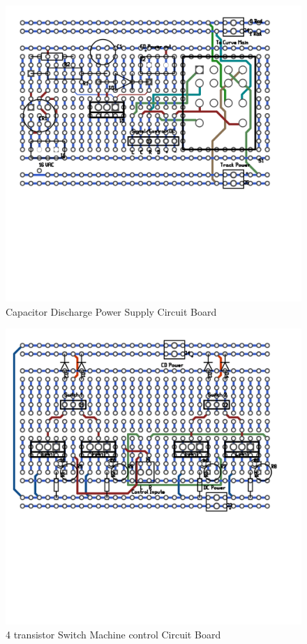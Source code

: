 \begin{figure}[hbpt]
\begin{centering}
\includegraphics[width=5in]{CD-on-SB400.pdf}
\caption{Capacitor Discharge Power Supply Circuit Board}
\label{fig:Turnouts:CD-on-SB400}
\end{centering}
\end{figure}
\begin{figure}[hbpt]
\begin{centering}
\includegraphics[width=5in]{4-CDtransistor-on-SB400.pdf}
\caption{4 transistor Switch Machine control Circuit Board}
\label{fig:Turnouts:4-CDtransistor-on-SB400}
\end{centering}
\end{figure}
